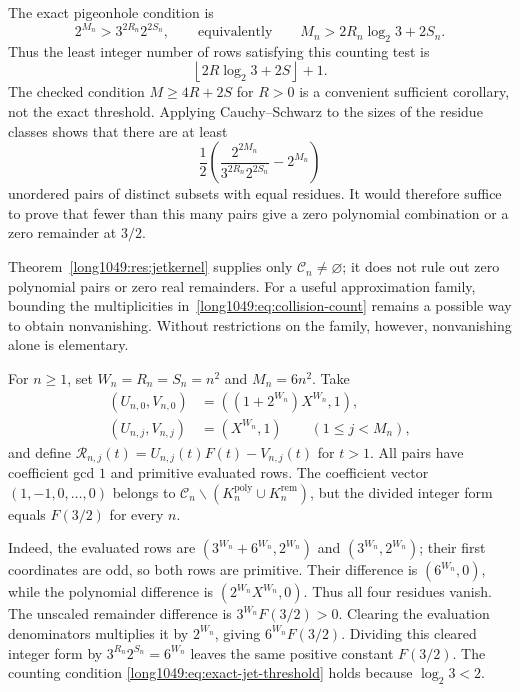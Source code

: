 The exact pigeonhole condition is
\begin{equation}
 2^{M_n}>3^{2R_n}2^{2S_n},
 \qquad\text{equivalently}\qquad
 M_n>2R_n\log_2 3+2S_n.
\label{long1049:eq:exact-jet-threshold}
\end{equation}
Thus the least integer number of rows satisfying this counting test is
\[
 \left\lfloor2R\log_2 3+2S\right\rfloor+1.
\]
The checked condition $M\ge4R+2S$ for $R>0$ is a convenient sufficient
corollary, not the exact threshold. Applying Cauchy--Schwarz to the
sizes of the residue classes shows that there are at least
\begin{equation}
 \frac12\left(\frac{2^{2M_n}}{3^{2R_n}2^{2S_n}}-2^{M_n}\right)
\label{long1049:eq:collision-count}
\end{equation}
unordered pairs of distinct subsets with equal residues. It would
therefore suffice to prove that fewer than this many pairs give a zero
polynomial combination or a zero remainder at $3/2$.

Theorem~\ref{long1049:res:jetkernel} supplies only
$\mathcal C_n\ne\varnothing$; it does not rule out zero polynomial pairs
or zero real remainders. For a useful approximation family, bounding
the multiplicities in~\eqref{long1049:eq:collision-count} remains a
possible way to obtain nonvanishing. Without restrictions on the
family, however, nonvanishing alone is elementary.

\begin{example}\label{long1049:prob:escape}
For $n\ge1$, set $W_n=R_n=S_n=n^2$ and $M_n=6n^2$. Take
\[
\begin{aligned}
 (U_{n,0},V_{n,0})&=((1+2^{W_n})X^{W_n},1),\\
 (U_{n,j},V_{n,j})&=(X^{W_n},1)\qquad(1\le j<M_n),
\end{aligned}
\]
and define $\mathcal R_{n,j}(t)=U_{n,j}(t)F(t)-V_{n,j}(t)$ for $t>1$.
All pairs have coefficient gcd $1$ and primitive evaluated rows. The
coefficient vector $(1,-1,0,\ldots,0)$ belongs to
$\mathcal C_n\mathbin{\backslash}
(K_n^{\mathrm{poly}}\cup K_n^{\mathrm{rem}})$, but the divided
integer form equals $F(3/2)$ for every $n$.
\end{example}

Indeed, the evaluated rows are
$(3^{W_n}+6^{W_n},2^{W_n})$ and $(3^{W_n},2^{W_n})$; their first
coordinates are odd, so both rows are primitive. Their difference is
$(6^{W_n},0)$, while the polynomial difference is
$(2^{W_n}X^{W_n},0)$. Thus all four residues vanish. The unscaled remainder difference
is $3^{W_n}F(3/2)>0$. Clearing the evaluation denominators multiplies
it by $2^{W_n}$, giving $6^{W_n}F(3/2)$. Dividing this cleared
integer form by $3^{R_n}2^{S_n}=6^{W_n}$ leaves the same positive
constant $F(3/2)$. The counting condition
\eqref{long1049:eq:exact-jet-threshold} holds because $\log_2 3<2$.


